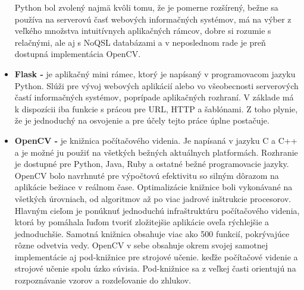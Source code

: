 \begin{itemize}
    Python bol zvolený najmä kvôli tomu, že je pomerne rozšírený, bežne sa používa na serverovú časť webových informačných systémov, má na výber z veľkého množstva intuitívnych aplikačných rámcov, dobre si rozumie s relačnými, ale aj s NoQSL databázami a v neposlednom rade je preň dostupná implementácia OpenCV.
    \item \textbf{Flask -} je aplikačný mini rámec, ktorý je napísaný v programovacom jazyku Python. Slúži pre vývoj webových aplikácií alebo vo všeobecnosti serverových častí informačných systémov, poprípade aplikačných rozhraní. V základe má k dispozícii iba funkcie s prácou pre URL, HTTP a šablónami. Z toho plynie, že je jednoduchý na osvojenie a pre účely tejto práce úplne postačuje. \cite{YNlrXY2RKWca3gk8}
    \item \textbf{OpenCV -} je knižnica počítačového videnia. Je napísaná v jazyku C a C++ a je možné ju použiť na všetkých bežných aktuálnych platformách. Rozhranie je dostupné pre Python, Java, Ruby a ostatné bežné programovacie jazyky. OpenCV bolo navrhnuté pre výpočtovú efektivitu so silným dôrazom na aplikácie bežiace v reálnom čase. Optimalizácie knižnice boli vykonávané na všetkých úrovniach, od algoritmov až po viac jadrové inštrukcie procesorov. Hlavným cieľom je ponúknuť jednoduchú infraštruktúru počítačového videnia, ktorá by pomáhala ľuďom tvoriť zložitejšie aplikácie oveľa rýchlejšie a jednoduchšie. Samotná knižnica obsahuje viac ako 500 funkcií, pokrývajúce rôzne odvetvia vedy. OpenCV v sebe obsahuje okrem svojej samotnej implementácie aj pod-knižnice pre strojové učenie. keďže počítačové videnie a strojové učenie spolu úzko súvisia. Pod-knižnice sa z veľkej časti orientujú na rozpoznávanie vzorov a rozdeľovanie do zhlukov. \cite{Bradskic2008}
\end{itemize}